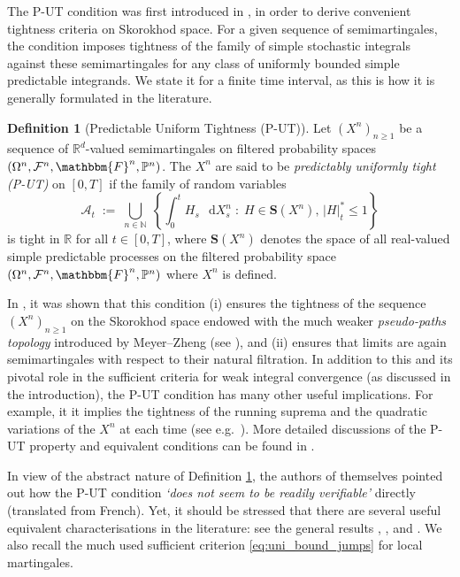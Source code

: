 \documentclass[11pt]{article}
\theoremstyle{definition}\newtheorem{example}[theorem]{Example}
\theoremstyle{definition}\newtheorem{counterexample}[theorem]{Counterexample}
\theoremstyle{definition}\newtheorem{remark}[theorem]{Remark}
\theoremstyle{definition}\newtheorem{defi}[theorem]{Definition}
\numberwithin{equation}{section}
\newcommand{\N}{\mathbb{N}}
\newcommand{\R}{\mathbb{R}}
\newcommand*\diff{\mathop{}\!\mathrm{d}}								%
\newcommand{\Pro}{\mathbb{P}}										%
\newcommand{\union}[2]{\overset{#2}{\bigcup\limits_{#1}}\;}					%
\renewcommand{\|}{\; : \, \;}											%
\begin{document}
The P-UT condition was first introduced in \cite{stricker}, in order to derive convenient tightness criteria on Skorokhod space. For a given sequence of semimartingales, the condition imposes tightness of the family of simple stochastic integrals against these semimartingales for any class of uniformly bounded simple predictable integrands. We state it for a finite time interval, as this is how it is generally formulated in the literature.

\begin{defi}[Predictable Uniform Tightness (P-UT)]\label{def:PUT}
	Let $(X^n)_{n\ge 1}$ be a sequence of $\R^d$-valued semimartingales on filtered probability spaces $(\Omega^n, \mathcal{F}^n, \mathbbm{F}^n, \Pro^n)$. The $X^n$ are said to be \emph{predictably uniformly tight (P-UT)} on $[0,T]$ if the family of random variables 
	$$ \mathcal{A}_t \; := \; \union{n\in\N}{} \left\{ \int_0^t  H_s \, \diff X^n_s \; : \; H \in \textbf{S}(X^n), \, |H|^*_t \le 1 \right\}$$
	is tight in $\R$ for all $t\in [0,T]$, where $\textbf{S}(X^n)$ denotes the space of all real-valued simple predictable processes on the filtered probability space $(\Omega^n, \mathcal{F}^n, \mathbbm{F}^n, \Pro^n)$ where $X^n$ is defined.
\end{defi}
In \cite{stricker}, it was shown that this condition (i) ensures the tightness of the sequence $(X^n)_{n\ge 1}$ on the Skorokhod space endowed with the much weaker \emph{pseudo-paths topology} introduced by Meyer--Zheng (see \cite{meyerzheng}), and (ii) ensures that limits are again semimartingales with respect to their natural filtration. 
In addition to this and its pivotal role in the sufficient criteria for weak integral convergence (as discussed in the introduction), the P-UT condition has many other useful implications. For example, it it implies the tightness of the running suprema and the quadratic variations of the $X^n$ at each time (see e.g.~\cite[Prop.~VI.6.7]{shiryaev}). More detailed discussions of the P-UT property and equivalent conditions can be found in \cite{jakubowskimeminpages, shiryaev, meminslominski}.

In view of the abstract nature of Definition \ref{def:PUT}, the authors of \cite{jakubowskimeminpages} themselves pointed out how the P-UT condition \emph{`does not seem to be readily verifiable'} directly (translated from French). Yet, it should be stressed that there are several useful equivalent characterisations in the literature: see the general results \cite[Thm.~VI.6.21]{shiryaev}, \cite[Lem.~3.1]{jakubowskimeminpages}, and \cite[Thm.~1.4]{meminslominski}. We also recall the much used sufficient criterion \eqref{eq:uni_bound_jumps} for local martingales. 
\end{document}
